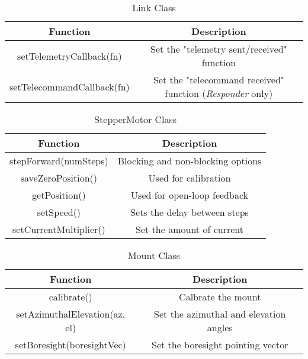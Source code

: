 \begin{table}[!htb]
  \centering
  \caption{Link Class}
  \renewcommand{\arraystretch}{1.2}
  \begin{tabular}{ |c|c| }
  \hline
  \textbf{Function}        & \textbf{Description}    \\
  \hline
  setTelemetryCallback(fn)                    & Set the "telemetry sent/received" function  \\
  setTelecommandCallback(fn)                  & Set the "telecommand received" function (\textit{Responder} only) \\
  \hline
  \end{tabular}
  \label{tab:linkUML}
\end{table}

\begin{table}[!htb]
  \centering
  \caption{StepperMotor Class}
  \renewcommand{\arraystretch}{1.2}
  \begin{tabular}{ |c|c| }
  \hline
  \textbf{Function}        & \textbf{Description}    \\
  \hline
    stepForward(numSteps)         & Blocking and non-blocking options \\
    saveZeroPosition()            & Used for calibration \\
    getPosition()                 & Used for open-loop feedback \\
    setSpeed()                    & Sets the delay between steps \\
    setCurrentMultiplier()        & Set the amount of current \\
  \hline
  \end{tabular}
  \label{tab:stepperMotorUML}
\end{table}

\begin{table}[!htb]
  \centering
  \caption{Mount Class}
  \renewcommand{\arraystretch}{1.2}
  \begin{tabular}{ |c|c| }
  \hline
  \textbf{Function}        & \textbf{Description}    \\
  \hline
    calibrate()                         & Calbrate the mount \\
    setAzimuthalElevation(az, el)       & Set the azimuthal and elevation angles \\
    setBoresight(boresightVec)          & Set the boresight pointing vector \\
  \hline
  \end{tabular}
  \label{tab:mountUML}
\end{table}

